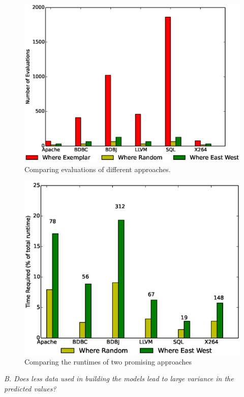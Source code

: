 \documentclass{sig-alternative}
\begin{document}
    \begin{figure}[!t]
\includegraphics[width=0.9\linewidth]{Figures/evaluation_graph.eps}
\caption{ Comparing evaluations of different approaches.  }\label{fig:Evaluations}
\end{figure}

    \begin{figure}[!t]
\includegraphics[width=0.9\linewidth]{Figures/sum_of_run_times_graph.eps}
\caption{ Comparing the runtimes of two promising approaches }\label{fig:Runtimes}
\end{figure}


\textit{B. Does less data used in building the models lead to large
variance in the predicted values?}\\
\end{document}
